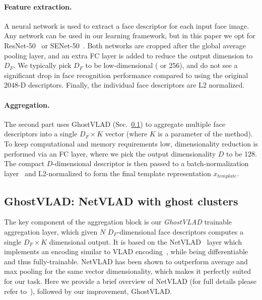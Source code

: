 \documentclass[runningheads]{llncs}
\begin{document}
\paragraph{Feature extraction.}
A neural network is used to extract
a face descriptor for each input face image.
Any network can be used in our learning framework,
but in this paper we opt for
ResNet-50~\cite{He16} or SENet-50~\cite{Hu18}.
Both networks are cropped 
after the global average pooling layer,
and an extra FC layer is added to reduce the 
output dimension to $D_F$.
We typically pick $D_F$ to be low-dimensional ( or 256),
and do not see
a significant drop in face recognition performance
compared to using the original 2048-D descriptors.
Finally, the individual face descriptors are L2 normalized.


\paragraph{Aggregation.}
The second part uses GhostVLAD (Sec.~\ref{sec:ghost})
to aggregate multiple face descriptors into a single
$D_F \times K$ vector (where $K$ is a parameter of the method).
To keep computational and memory requirements low,
dimensionality reduction is performed via an FC layer,
where we pick the output dimensionality $D$ to be 128.
The compact $D$-dimensional
descriptor is then passed to a batch-normalization
layer~\cite{Ioffe15} and L2-normalized 
to form the final template 
representation $x_{template}$.


\subsection{GhostVLAD: NetVLAD with ghost clusters} \label{sec:ghost}
The key component of the aggregation block is our \emph{GhostVLAD}
trainable aggregation layer, which given $N$ $D_F$-dimensional face descriptors computes a single $D_F \times K$ dimensional output.
It is based on the NetVLAD~\cite{Arandjelovic16} layer
which implements an encoding similar to 
VLAD encoding~\cite{Jegou10}, while being 
differentiable and thus fully-trainable.
NetVLAD  has been shown to outperform average and max pooling for the same
vector dimensionality, which makes
it perfectly suited for our task.
Here we provide a brief overview of NetVLAD
(for full details please refer to~\cite{Arandjelovic16}),
followed by our improvement, GhostVLAD.
\end{document}
